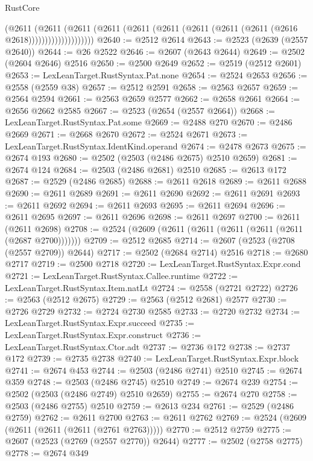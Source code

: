 \begin{lexlean}{RustCore}
\begin{coremodule}
                        (@2611
                          (@2611
                            (@2611
                              (@2611
                                (@2611 (@2611 (@2611 (@2611 (@2611 (@2616 @2618))))))))))))))))))))
@2640 := @2512 @2614
@2643 := @2523 (@2639 (@2557 @2640))
@2644 := @26 @2522
@2646 := @2607 (@2643 @2644)
@2649 := @2502 (@2604 @2646) @2516
@2650 := @2500 @2649
@2652 := @2519 (@2512 @2601)
@2653 := LexLeanTarget.RustSyntax.Pat.none
@2654 := @2524 @2653
@2656 := @2558 (@2559 @38)
@2657 := @2512 @2591
@2658 := @2563 @2657
@2659 := @2564 @2594
@2661 := @2563 @2659 @2577
@2662 := @2658 @2661
@2664 := @2656 @2662 @2585
@2667 := @2523 (@2654 (@2557 @2664))
@2668 := LexLeanTarget.RustSyntax.Pat.some
@2669 := @2488 @270
@2670 := @2486 @2669
@2671 := @2668 @2670
@2672 := @2524 @2671
@2673 := LexLeanTarget.RustSyntax.IdentKind.operand
@2674 := @2478 @2673
@2675 := @2674 @193
@2680 := @2502 (@2503 (@2486 @2675) @2510 @2659)
@2681 := @2674 @124
@2684 := @2503 (@2486 @2681) @2510
@2685 := @2613 @172
@2687 := @2529 (@2486 @2685)
@2688 := @2611 @2618
@2689 := @2611 @2688
@2690 := @2611 @2689
@2691 := @2611 @2690
@2692 := @2611 @2691
@2693 := @2611 @2692
@2694 := @2611 @2693
@2695 := @2611 @2694
@2696 := @2611 @2695
@2697 := @2611 @2696
@2698 := @2611 @2697
@2700 := @2611 (@2611 @2698)
@2708 := @2524 (@2609 (@2611 (@2611 (@2611 (@2611 (@2611 (@2687 @2700)))))))
@2709 := @2512 @2685
@2714 := @2607 (@2523 (@2708 (@2557 @2709)) @2644)
@2717 := @2502 (@2684 @2714) @2516
@2718 := @2680 @2717
@2719 := @2500 @2718
@2720 := LexLeanTarget.RustSyntax.Expr.cond
@2721 := LexLeanTarget.RustSyntax.Callee.runtime
@2722 := LexLeanTarget.RustSyntax.Item.natLt
@2724 := @2558 (@2721 @2722)
@2726 := @2563 (@2512 @2675)
@2729 := @2563 (@2512 @2681) @2577
@2730 := @2726 @2729
@2732 := @2724 @2730 @2585
@2733 := @2720 @2732
@2734 := LexLeanTarget.RustSyntax.Expr.succeed
@2735 := LexLeanTarget.RustSyntax.Expr.construct
@2736 := LexLeanTarget.RustSyntax.Ctor.adt
@2737 := @2736 @172
@2738 := @2737 @172
@2739 := @2735 @2738
@2740 := LexLeanTarget.RustSyntax.Expr.block
@2741 := @2674 @453
@2744 := @2503 (@2486 @2741) @2510
@2745 := @2674 @359
@2748 := @2503 (@2486 @2745) @2510
@2749 := @2674 @239
@2754 := @2502 (@2503 (@2486 @2749) @2510 @2659)
@2755 := @2674 @270
@2758 := @2503 (@2486 @2755) @2510
@2759 := @2613 @234
@2761 := @2529 (@2486 @2759)
@2762 := @2611 @2700
@2763 := @2611 @2762
@2769 := @2524 (@2609 (@2611 (@2611 (@2611 (@2761 @2763)))))
@2770 := @2512 @2759
@2775 := @2607 (@2523 (@2769 (@2557 @2770)) @2644)
@2777 := @2502 (@2758 @2775)
@2778 := @2674 @349

\end{coremodule}
\end{lexlean}
